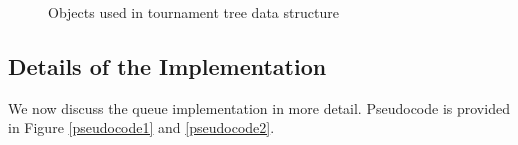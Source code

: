\begin{figure}
\begin{algorithmic}[1]

\end{algorithmic}
\caption{Objects used in tournament tree data structure \label{object-fields}}
\end{figure}

\subsection{Details of the Implementation}

We now discuss the queue implementation in more detail.  Pseudocode is provided in Figure \ref{pseudocode1} and \ref{pseudocode2}.


\renewcommand{\algorithmiccomment}[1]{\hfill\eqparbox{COMMENTDOUBLE}{\com\ #1}}

